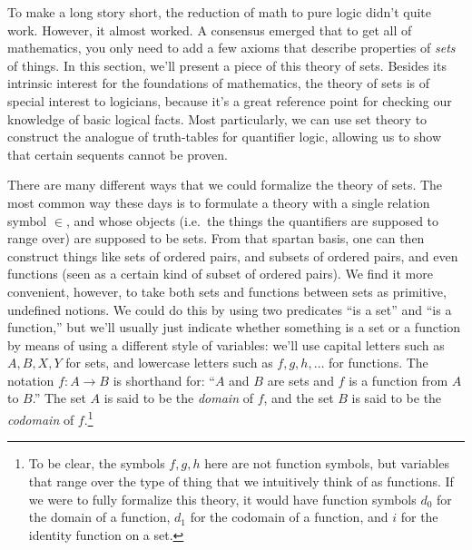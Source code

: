 To make a long story short, the reduction of math to pure logic didn't
quite work.  However, it almost worked.  A consensus emerged that to
get all of mathematics, you only need to add a few axioms that
describe properties of \emph{sets} of things.  In this section, we'll
present a piece of this theory of sets.  Besides its intrinsic
interest for the foundations of mathematics, the theory of sets is of
special interest to logicians, because it's a great reference point
for checking our knowledge of basic logical facts.  Most particularly,
we can use set theory to construct the analogue of truth-tables for
quantifier logic, allowing us to show that certain sequents cannot be
proven.

There are many different ways that we could formalize the theory of
sets.  The most common way these days is to formulate a theory with a
single relation symbol $\in$, and whose objects (i.e.\ the things the
quantifiers are supposed to range over) are supposed to be sets.  From
that spartan basis, one can then construct things like sets of ordered
pairs, and subsets of ordered pairs, and even functions (seen as a
certain kind of subset of ordered pairs).  We find it more convenient,
however, to take both sets and functions between sets as primitive,
undefined notions.  We could do this by using two predicates ``is a
set'' and ``is a function,'' but we'll usually just indicate whether
something is a set or a function by means of using a different style
of variables: we'll use capital letters such as $A,B,X,Y$ for sets,
and lowercase letters such as $f,g,h,\dots $ for functions.  The
notation $f:A\to B$ is shorthand for: ``$A$ and $B$ are sets and $f$
is a function from $A$ to $B$.''  The set $A$ is said to be the
\emph{domain} of $f$, and the set $B$ is said to be the
\emph{codomain} of $f$.\footnote{To be clear, the symbols $f,g,h$ here
  are not function symbols, but variables that range over the type of
  thing that we intuitively think of as functions.  If we were to
  fully formalize this theory, it would have function symbols $d_0$
  for the domain of a function, $d_1$ for the codomain of a function,
  and $i$ for the identity function on a set.}

